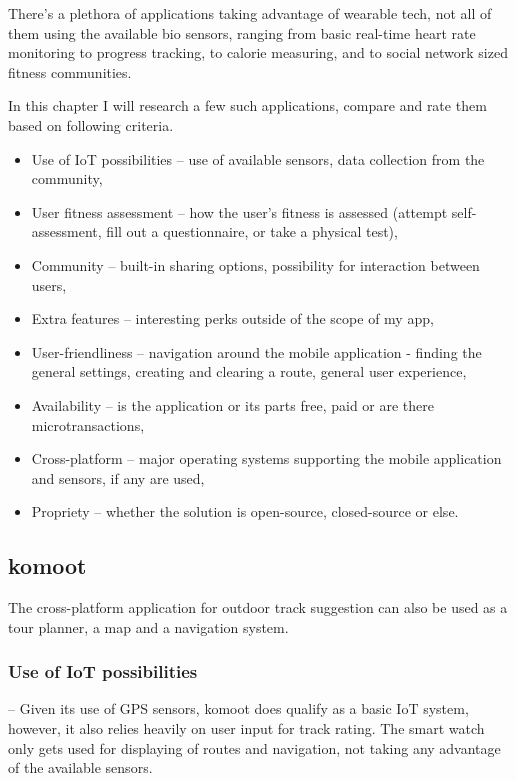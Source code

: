 There's a plethora of applications taking advantage of wearable tech, not all of them using the available bio sensors, ranging from basic real-time heart rate monitoring to progress tracking, to calorie measuring, and to social network sized fitness communities.

In this chapter I will research a few such applications, compare and rate them based on following criteria. 
\begin{itemize}
    \item Use of IoT possibilities -- use of available sensors, data collection from the community,
    \item User fitness assessment -- how the user's fitness is assessed (attempt self-assessment, fill out a questionnaire, or take a physical test),
    \item Community -- built-in sharing options, possibility for interaction between users,
    \item Extra features -- interesting perks outside of the scope of my app,
    \item User-friendliness -- navigation around the mobile application - finding the general settings, creating and clearing a route, general user experience,
    \item Availability -- is the application or its parts free, paid or are there microtransactions,
    \item Cross-platform -- major operating systems supporting the mobile application and sensors, if any are used,
    \item Propriety -- whether the solution is open-source, closed-source or else.
\end{itemize}


\subsection{komoot}
The cross-platform application for outdoor track suggestion can also be used as a tour planner, a map and a navigation system.


\subsubsection*{Use of IoT possibilities} -- Given its use of GPS sensors, komoot does qualify as a basic IoT system, however, it also relies heavily on user input for track rating.
The smart watch only gets used for displaying of routes and navigation, not taking any advantage of the available sensors.
